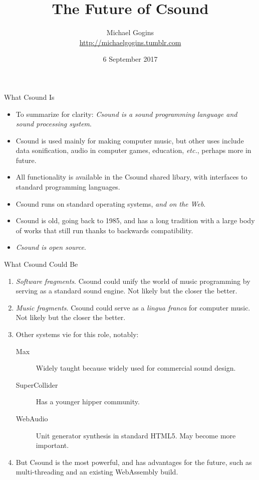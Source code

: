 \documentclass{beamer}
\title[Future Csound] %
{The Future of Csound}
\author[Gogins] %
{Michael Gogins\\
\url{http://michaelgogins.tumblr.com} 
}
\institute[Irreducible Productions] %
{
  Irreducible Productions\\
  New York
}
\date[6 September 2017] %
{6 September 2017}
\begin{document}

\begin{frame}
  \titlepage
\end{frame}

\begin{frame}{What Csound Is}
    \begin{itemize}
        \item     
            To summarize for clarity: \textit{Csound is a sound programming 
language and sound processing system}.
        \item
            Csound is used mainly for making computer music, but other 
uses include data sonification, audio in computer games, 
education, \textit{etc.}, perhaps more in future.
        \item
            All functionality is available in the Csound shared 
libary, with interfaces to standard programming languages.
        \item
            Csound runs on standard operating systems, \textit{and on the Web}.
        \item
            Csound is old, going back to 1985, and has a long tradition with a 
large body of works that still run thanks to backwards compatibility.
        \item 
           \textit{ Csound is open source}.
    \end{itemize}    
\end{frame}

\begin{frame}{What Csound Could Be}
    \begin{enumerate}
        \item \textit{Software fragments}. Csound could unify the world of 
music programming by serving as a standard sound engine. Not likely but the 
closer the better.
        \item \textit{Music fragments}. Csound could serve as a \textit{lingua 
franca} for computer music. Not likely but the closer the 
better.
        \item Other systems vie for this role, notably:
            \begin{description}
             \item[Max] Widely taught because widely used for 
commercial sound design.
             \item[SuperCollider] Has a younger hipper community.
             \item[WebAudio] Unit generator synthesis in standard 
HTML5. May become more important.
            \end{description}
        \item But Csound is the most powerful, and has advantages for the 
future, such as multi-threading and an existing WebAssembly build.
    \end{enumerate}    
\end{frame}
\end{document}
